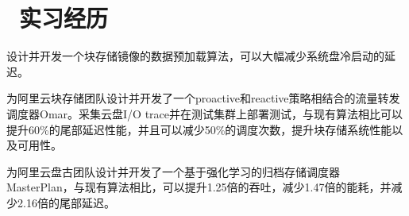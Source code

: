 \documentclass{resume}
\begin{document}
\section{\faUsers\ 实习经历}
设计并开发一个块存储镜像的数据预加载算法，可以大幅减少系统盘冷启动的延迟。

为阿里云块存储团队设计并开发了一个proactive和reactive策略相结合的流量转发调度器Omar。采集云盘I/O trace并在测试集群上部署测试，与现有算法相比可以提升60\%的尾部延迟性能，并且可以减少50\%的调度次数，提升块存储系统性能以及可用性。

为阿里云盘古团队设计并开发了一个基于强化学习的归档存储调度器MasterPlan，与现有算法相比，可以提升1.25倍的吞吐，减少1.47倍的能耗，并减少2.16倍的尾部延迟。

\end{document}
